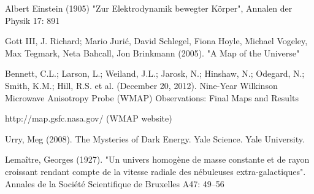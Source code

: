 \documentclass{article}
\begin{document}

\begin{thebibliography}{9}

Albert Einstein (1905) "Zur Elektrodynamik bewegter Körper", Annalen der Physik 17: 891

Gott III, J. Richard; Mario Jurić, David Schlegel, Fiona Hoyle, Michael Vogeley, Max Tegmark, Neta Bahcall, Jon Brinkmann (2005). "A Map of the Universe"

Bennett, C.L.; Larson, L.; Weiland, J.L.; Jarosk, N.; Hinshaw, N.; Odegard, N.; Smith, K.M.; Hill, R.S. et al. (December 20, 2012). Nine-Year Wilkinson Microwave Anisotropy Probe (WMAP) Observations: Final Maps and Results

http://map.gsfc.nasa.gov/ (WMAP website)

Urry, Meg (2008). The Mysteries of Dark Energy. Yale Science. Yale University.

Lemaître, Georges (1927). "Un univers homogène de masse constante et de rayon croissant rendant compte de la vitesse radiale des nébuleuses extra-galactiques". Annales de la Société Scientifique de Bruxelles A47: 49–56

\end{thebibliography}
\end{document}
